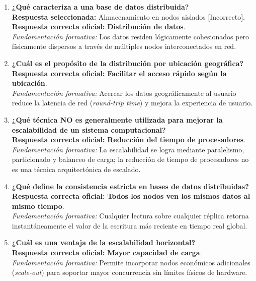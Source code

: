 \documentclass[11pt,a4paper]{article}
\begin{document}
\begin{enumerate}[label=\textbf{Pregunta \arabic*.}]
    \item \textbf{¿Qué caracteriza a una base de datos distribuida?}\\
    \textbf{Respuesta seleccionada:} Almacenamiento en nodos aislados [Incorrecto].\\
    \textbf{Respuesta correcta oficial:} \textbf{Distribución de datos}.\\
    \textit{Fundamentación formativa:} Los datos residen lógicamente cohesionados pero físicamente dispersos a través de múltiples nodos interconectados en red.

    \item \textbf{¿Cuál es el propósito de la distribución por ubicación geográfica?}\\
    \textbf{Respuesta correcta oficial:} \textbf{Facilitar el acceso rápido según la ubicación}.\\
    \textit{Fundamentación formativa:} Acercar los datos geográficamente al usuario reduce la latencia de red (\textit{round-trip time}) y mejora la experiencia de usuario.

    \item \textbf{¿Qué técnica NO es generalmente utilizada para mejorar la escalabilidad de un sistema computacional?}\\
    \textbf{Respuesta correcta oficial:} \textbf{Reducción del tiempo de procesadores}.\\
    \textit{Fundamentación formativa:} La escalabilidad se logra mediante paralelismo, particionado y balanceo de carga; la reducción de tiempo de procesadores no es una técnica arquitectónica de escalado.

    \item \textbf{¿Qué define la consistencia estricta en bases de datos distribuidas?}\\
    \textbf{Respuesta correcta oficial:} \textbf{Todos los nodos ven los mismos datos al mismo tiempo}.\\
    \textit{Fundamentación formativa:} Cualquier lectura sobre cualquier réplica retorna instantáneamente el valor de la escritura más reciente en tiempo real global.

    \item \textbf{¿Cuál es una ventaja de la escalabilidad horizontal?}\\
    \textbf{Respuesta correcta oficial:} \textbf{Mayor capacidad de carga}.\\
    \textit{Fundamentación formativa:} Permite incorporar nodos económicos adicionales (\textit{scale-out}) para soportar mayor concurrencia sin límites físicos de hardware.


\end{enumerate}
\end{document}
